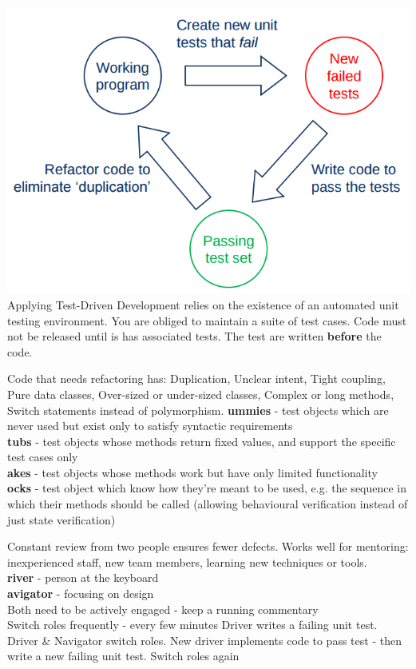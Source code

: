 \documentclass[number]{assignment}
\begin{document}
\begin{landscape}
\begin{multicols}{3}
\begin{multicols}{2}
\includegraphics[width=\linewidth]{Cycle.png}
Applying Test-Driven Development relies on the existence of an automated unit testing environment. You are obliged to maintain a suite of test cases. Code must not be released until is has associated tests. The test are written \textbf{before} the code.
\end{multicols}
Code that needs refactoring has: Duplication, Unclear intent, Tight coupling, Pure data classes, Over-sized or under-sized classes, Complex or long methods, Switch statements instead of polymorphism.
\textbf{ummies} - test objects which are never used but exist only to satisfy syntactic requirements\\
\textbf{tubs} - test objects whose methods return fixed values, and support the specific test cases only\\
\textbf{akes} - test objects whose methods work but have only limited functionality\\
\textbf{ocks} - test object which know how they're meant to be used, e.g. the sequence in which their methods should be called (allowing behavioural verification instead of just state verification)

Constant review from two people ensures fewer defects. Works well for mentoring: inexperienced staff, new team members, learning new techniques or tools.\\
\textbf{river} - person at the keyboard\\
\textbf{avigator} - focusing on design\\
Both need to be actively engaged - keep a running commentary\\
Switch roles frequently - every few minutes
Driver writes a failing unit test. Driver \& Navigator switch roles. New driver implements code to pass test - then write a new failing unit test. Switch roles again


\end{multicols}
\end{landscape}
\end{document}
